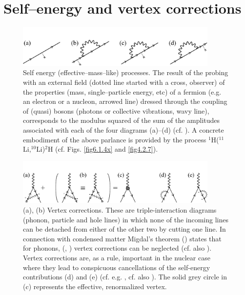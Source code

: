 \section{Self--energy and vertex corrections}\label{C6AppD}
 \begin{figure}
\centerline{\includegraphics*[width=10cm,angle=0]{C6/figs_C6/fig6_C1}}
\caption{Self energy (effective--mass--like) processes. The result of the probing with an external field (dotted line started with a cross, observer) of the properties (mass, single--particle energy, etc) of a fermion (e.g. an electron or a nucleon, arrowed line) dressed through the coupling of (quasi) bosons (photons or collective vibrations, wavy line), corresponds to the modulus squared of the sum of the amplitudes associated with each of the four diagrams (a)--(d) (cf. \citep{Feynman:75}). A concrete embodiment of the above parlance is provided by the process $^1$H($^{11}$Li,$^{10}$Li)$^2$H (cf. Figs. \ref{fig6.1.4x} and \ref{fig4.2.7}).}\label{fig6_D1}
\end{figure}
 \begin{figure}
\centerline{\includegraphics*[width=10cm,angle=0]{C6/figs_C6/fig6_C2}}
\caption{(a), (b) Vertex corrections. These are triple-interaction  diagrams (phonon, particle and hole lines) in which none of the incoming lines can be detached from either of the other two by cutting one line. In connection with condensed matter Migdal's theorem  (\cite{Migdal:58}) states that for phonons, (\cite{Bardeen:55},  \cite{Frohlich:52}) vertex corrections can be neglected (cf. also \cite{Anderson:64}). Vertex corrections are, as a rule, important in the nuclear case where they lead to conspicuous cancellations of the self-energy contributions (d) and (e) (cf. e.g. \cite{Bortignon:83}, cf. also \cite{Anderson:64}). The solid grey circle in (c) represents the effective, renormalized vertex. }\label{fig6_D2}
\end{figure}
